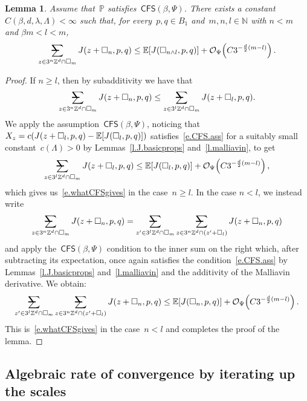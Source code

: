 \documentclass[11pt]{article} %
\makeatletter
\let\oldsquare\square %
\renewcommand{\square}{\oldsquare}
\numberwithin{equation}{section}
\newtheorem{lemma}[theorem]{Lemma}
\theoremstyle{definition}
\let\originalleft\left
\let\originalright\right
\renewcommand{\left}{\mathopen{}\mathclose\bgroup\originalleft}
\renewcommand{\right}{\aftergroup\egroup\originalright}
\newcommand*{\N}{\ensuremath{\mathbb{N}}}
\newcommand*{\Zd}{\ensuremath{\mathbb{Z}^d}}
\newcommand{\cu}{\square}
\renewcommand{\P}{\mathbb{P}}
\newcommand{\E}{\mathbb{E}}
\renewcommand{\O}{\mathcal{O}}
\newcommand{\avsum}{\mathop{\mathpalette\avsuminner\relax}\displaylimits}
\newcommand\avsuminner[2]{%
  {\sbox0{$\m@th#1\sum$}%
   \vphantom{\usebox0}%
   \ooalign{%
     \hidewidth
     \smash{\,\rule[.23em]{8.8pt}{1.1pt} \relax}%
     \hidewidth\cr
     $\m@th#1\sum$\cr
   }%
  }%
}
\newcommand{\CFS}{\mathsf{CFS}}
\makeatother
\begin{document}
\begin{lemma}
\label{l.J.upperfluct}
Assume that~$\P$ satisfies~$\CFS(\beta,\Psi)$. 
There exists a constant~$C(\beta,d,\lambda,\Lambda)<\infty$ such that, for every~$p,q\in B_1$ 
and~$m,n,l\in\N$ with $n < m$ and $\beta m < l < m$,
\begin{align}
\label{e.whatCFSgives}
\avsum_{z\in 3^n\Zd\cap \cu_m} 
J(z+\cu_n,p,q)
\leq 
\E \left[ J( \cu_{n\wedge l},p,q) \right]
+ 
\O_\Psi\Bigl( C3^{-\frac d2(m-l)} \Bigr)
\,.
\end{align}
\end{lemma}
\begin{proof}
If $n\geq l$, then by subadditivity we have that 
\begin{align*}
\avsum_{z\in 3^n\Zd\cap \cu_m} 
J(z+\cu_n,p,q)
\leq 
\avsum_{z\in 3^l\Zd\cap \cu_m} 
J(z+\cu_l,p,q).
\end{align*}
We apply the assumption~$\CFS(\beta,\Psi)$, noticing that~$X_z = c \left( J(z+\cu_l,p,q) - \E \left[ J(\cu_l,p,q) \right]\right)$ satisfies~\eqref{e.CFS.ass} for a suitably small constant~$c(\Lambda)>0$ by Lemmas~\ref{l.J.basicprops} and~\ref{l.malliavin}, 
to get
\begin{equation*}
\avsum_{z\in 3^l\Zd\cap \cu_m} 
J(z+\cu_l,p,q) 
\leq 
\E \left[ J(\cu_l,p,q) \right] 
+ 
\O_\Psi\Bigl( C3^{-\frac d2(m-l)} \Bigr)
\,,
\end{equation*}
which gives us~\eqref{e.whatCFSgives} in the case~$n\geq l$. 
In the case $n<l$, we instead write 
\begin{equation*}
\avsum_{z\in 3^n\Zd\cap \cu_m} 
J(z+\cu_n,p,q)
=
\avsum_{z'\in 3^l\Zd\cap \cu_m}
\avsum_{z\in 3^n\Zd\cap (z'+\cu_l)} 
J(z+\cu_n,p,q)
\end{equation*}
and apply the~$\CFS(\beta,\Psi)$ condition to the inner sum on the right which, after subtracting its expectation, once again satisfies the condition~\eqref{e.CFS.ass} by Lemmas~\ref{l.J.basicprops} and~\ref{l.malliavin} and the additivity of the Malliavin derivative. We obtain:
\begin{align*}
\avsum_{z'\in 3^l\Zd\cap \cu_m}
\avsum_{z\in 3^n\Zd\cap (z'+\cu_l)} 
J(z+\cu_n,p,q)
\leq 
\E \left[ J(\cu_n,p,q) \right] 
+
\O_\Psi\Bigl( C3^{-\frac d2(m-l)} \Bigr)
\,. 
\end{align*}
This is~\eqref{e.whatCFSgives} in the case~$n< l$ and completes the proof of the lemma. 
\end{proof}



\subsection{Algebraic rate of convergence by iterating up the scales}
\label{ss.subadd.conv}
\end{document}
